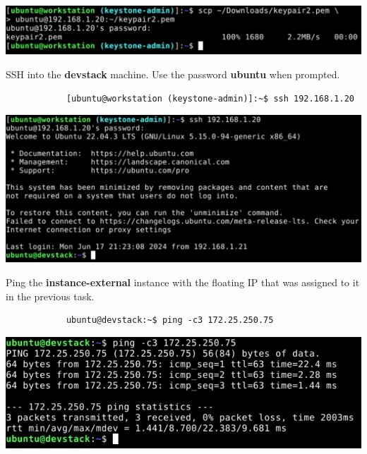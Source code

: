 \documentclass[letterpaper, 12pt]{article}
\begin{document}
\begin{enumerate}
\begin{labstep}
        \begin{center}
            \includegraphics[width=\linewidth]{images/part6/step7.png}
        \end{center}
    \end{labstep}

    \begin{labstep}
        SSH into the \textbf{devstack} machine.
        Use the password \textbf{ubuntu} when prompted.
        \begin{lstlisting}
            [ubuntu@workstation (keystone-admin)]:~$ ssh 192.168.1.20
        \end{lstlisting}

        \begin{center}
            \includegraphics[width=\linewidth]{images/part6/step8.png}
        \end{center}
    \end{labstep}

    \begin{labstep}
        Ping the \textbf{instance-external} instance with the floating IP that was assigned to it in the previous task.
        \begin{lstlisting}
            ubuntu@devstack:~$ ping -c3 172.25.250.75
        \end{lstlisting}

        \begin{center}
            \includegraphics[width=\linewidth]{images/part6/step9.png}
        \end{center}
    \end{labstep}


\end{enumerate}
\end{document}
